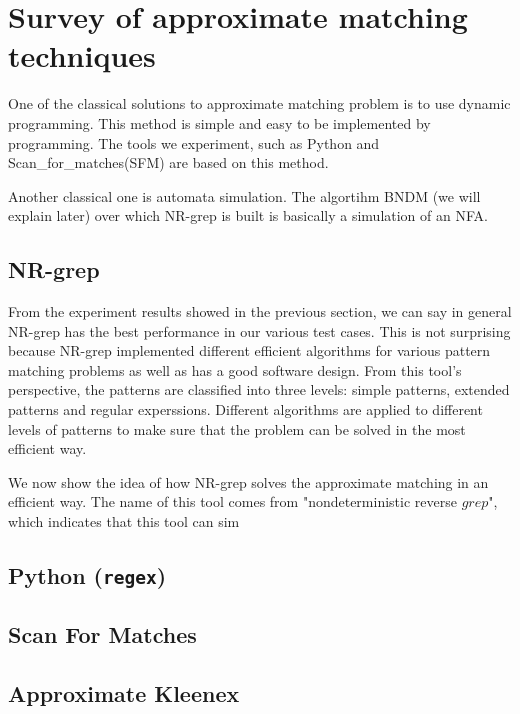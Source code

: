 \section{Survey of approximate matching techniques}
One of the classical solutions to approximate matching problem is to use dynamic programming. This method is simple and easy to be implemented by programming. The tools we experiment, such as Python and Scan\_for\_matches(SFM) are based on this method.

Another classical one is automata simulation. The algortihm BNDM  (we will explain later) over which NR-grep is built is basically a simulation of an NFA. 

\subsection{NR-grep}
From the experiment results showed in the previous section, we can say in general NR-grep has the best performance in our various test cases. This is not surprising because NR-grep implemented different efficient algorithms for various pattern matching problems as well as has a good software design. From this tool's perspective, the patterns are classified into three levels: simple patterns, extended patterns and regular experssions. Different algorithms are applied to different levels of patterns to make sure that the problem can be solved in the most efficient way. 

We now show the idea of how NR-grep solves the approximate matching in an efficient way. The name of this tool comes from "nondeterministic reverse $grep$", which indicates that this tool can sim


\subsection{Python (\texttt{regex})}

\subsection{Scan For Matches}


\subsection{Approximate Kleenex}